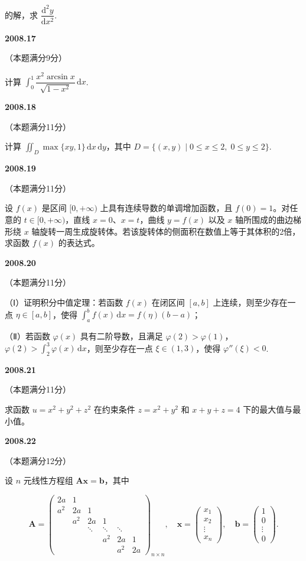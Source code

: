 \documentclass[UTF8,12pt,fontset=windows]{ctexart}
\begin{document}
的解，求 $\dfrac{\mathrm{d}^2 y}{\mathrm{d}x^2}$.

\vfill
\newpage
{\large\bfseries 2008.17}

（本题满分9分）

计算 $\int_0^1 \dfrac{x^2 \arcsin x}{\sqrt{1 - x^2}} \,\mathrm{d}x$.

\vfill
\newpage
{\large\bfseries 2008.18}

（本题满分11分）

计算 $\iint_D \max\{xy, 1\} \,\mathrm{d}x\,\mathrm{d}y$，其中 $D = \{(x, y) \mid 0 \leqslant x \leqslant 2, \; 0 \leqslant y \leqslant 2\}$.

\vfill
\newpage
{\large\bfseries 2008.19}

（本题满分11分）

设 $f(x)$ 是区间 $[0, +\infty)$ 上具有连续导数的单调增加函数，且 $f(0) = 1$。对任意的 $t \in [0, +\infty)$，直线 $x = 0$、$x = t$，曲线 $y = f(x)$ 以及 $x$ 轴所围成的曲边梯形绕 $x$ 轴旋转一周生成旋转体。若该旋转体的侧面积在数值上等于其体积的2倍，求函数 $f(x)$ 的表达式。

\vfill
\newpage
{\large\bfseries 2008.20}

（本题满分11分）

（Ⅰ）证明积分中值定理：若函数 $f(x)$ 在闭区间 $[a, b]$ 上连续，则至少存在一点 $\eta \in [a, b]$，使得 $\int_a^b f(x) \,\mathrm{d}x = f(\eta)(b - a)$；

（Ⅱ）若函数 $\varphi(x)$ 具有二阶导数，且满足 $\varphi(2) > \varphi(1)$，$\varphi(2) > \int_2^3 \varphi(x) \,\mathrm{d}x$，则至少存在一点 $\xi \in (1, 3)$，使得 $\varphi''(\xi) < 0$.

\vfill
\newpage
{\large\bfseries 2008.21}

（本题满分11分）

求函数 $u = x^2 + y^2 + z^2$ 在约束条件 $z = x^2 + y^2$ 和 $x + y + z = 4$ 下的最大值与最小值。

\vfill
\newpage
{\large\bfseries 2008.22}

（本题满分12分）

设 $n$ 元线性方程组 $\boldsymbol{Ax} = \boldsymbol{b}$，其中

$$
\boldsymbol{A} = \begin{pmatrix}
2a & 1 & & & \\
a^2 & 2a & 1 & & \\
& a^2 & 2a & 1 & \\
& & \ddots & \ddots & \ddots \\
& & & a^2 & 2a & 1 \\
& & & & a^2 & 2a
\end{pmatrix}_{n \times n}, \quad
\boldsymbol{x} = \begin{pmatrix} x_1 \\ x_2 \\ \vdots \\ x_n \end{pmatrix}, \quad
\boldsymbol{b} = \begin{pmatrix} 1 \\ 0 \\ \vdots \\ 0 \end{pmatrix}.
$$
\end{document}

